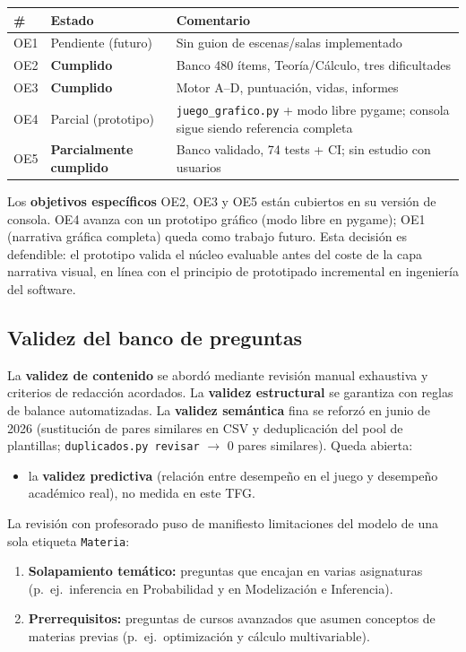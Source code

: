 \documentclass[11pt,a4paper]{article}
\newcommand{\iniciotabla}{\par\medskip\renewcommand{\arraystretch}{1.12}}
\newcommand{\fintabla}{\par\medskip}
\begin{document}
\iniciotabla
\begin{tabular}{@{}llp{6.5cm}@{}}
\toprule
\textbf{\#} & \textbf{Estado} & \textbf{Comentario} \\
\midrule
OE1 & Pendiente (futuro) & Sin guion de escenas/salas implementado \\
OE2 & \textbf{Cumplido} & Banco 480 ítems, Teoría/Cálculo, tres dificultades \\
OE3 & \textbf{Cumplido} & Motor A--D, puntuación, vidas, informes \\
OE4 & Parcial (prototipo) & \texttt{juego\_grafico.py} + modo libre pygame; consola sigue siendo referencia completa \\
OE5 & \textbf{Parcialmente cumplido} & Banco validado, 74 tests + CI; sin estudio con usuarios \\
\bottomrule
\end{tabular}
\fintabla

Los \textbf{objetivos específicos} OE2, OE3 y OE5 están cubiertos en su versión de consola. OE4 avanza con un prototipo gráfico (modo libre en pygame); OE1 (narrativa gráfica completa) queda como trabajo futuro. Esta decisión es defendible: el prototipo valida el núcleo evaluable antes del coste de la capa narrativa visual, en línea con el principio de prototipado incremental en ingeniería del software.

\subsection{Validez del banco de preguntas}

La \textbf{validez de contenido} se abordó mediante revisión manual exhaustiva y criterios de redacción acordados. La \textbf{validez estructural} se garantiza con reglas de balance automatizadas. La \textbf{validez semántica} fina se reforzó en junio de 2026 (sustitución de pares similares en CSV y deduplicación del pool de plantillas; \texttt{duplicados.py revisar} $\rightarrow$ 0 pares similares). Queda abierta:
\begin{itemize}
  \item la \textbf{validez predictiva} (relación entre desempeño en el juego y desempeño académico real), no medida en este TFG.
\end{itemize}

La revisión con profesorado puso de manifiesto limitaciones del modelo de una sola etiqueta \texttt{Materia}:
\begin{enumerate}
  \item \textbf{Solapamiento temático:} preguntas que encajan en varias asignaturas (p.\ ej.\ inferencia en Probabilidad y en Modelización e Inferencia).
  \item \textbf{Prerrequisitos:} preguntas de cursos avanzados que asumen conceptos de materias previas (p.\ ej.\ optimización y cálculo multivariable).
\end{enumerate}
\end{document}
